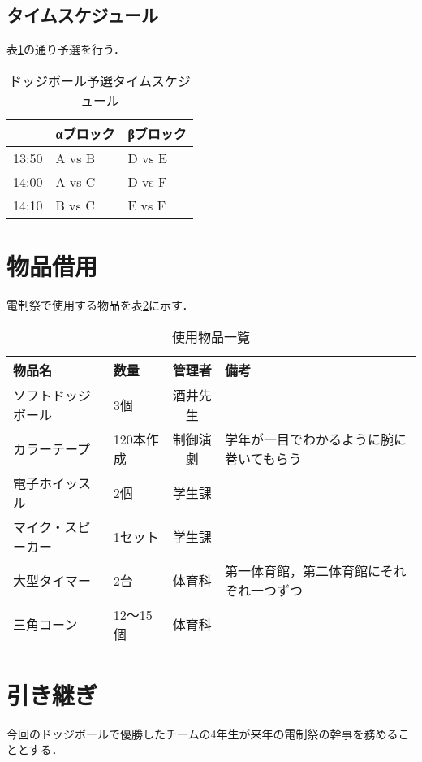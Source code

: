 \documentclass[dvipdfmx]{jsarticle}
\begin{document}
\subsection{タイムスケジュール}
表\ref{block}の通り予選を行う．
\begin{table}[H]
  \caption{ドッジボール予選タイムスケジュール}
  \label{block}
  \centering
  \begin{tabular}{l|ll}
          & αブロック  & βブロック  \\\hline\hline
    13:50 & A vs B & D vs E \\
    14:00 & A vs C & D vs F \\
    14:10 & B vs C & E vs F
  \end{tabular}
\end{table}

\section{物品借用}
電制祭で使用する物品を表\ref{buppin}に示す．
\begin{table}[H]
  \caption{使用物品一覧}
  \label{buppin}
  \centering
  \begin{tabular}{l|lcl}
    物品名       & 数量     & 管理者  & 備考                   \\\hline\hline
    ソフトドッジボール & 3個     & 酒井先生 &                      \\
    カラーテープ    & 120本作成 & 制御演劇 & 学年が一目でわかるように腕に巻いてもらう \\
    電子ホイッスル   & 2個     & 学生課  &                      \\
    マイク・スピーカー & 1セット   & 学生課  &                      \\
    大型タイマー    & 2台     & 体育科  & 第一体育館，第二体育館にそれぞれ一つずつ \\
    三角コーン     & 12～15個 & 体育科  &
  \end{tabular}
\end{table}

\section{引き継ぎ}
今回のドッジボールで優勝したチームの4年生が来年の電制祭の幹事を務めることとする．
\end{document}
